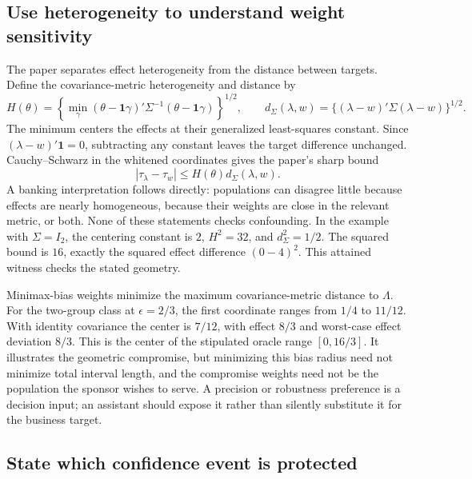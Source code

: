 \subsection{Use heterogeneity to understand weight sensitivity}

The paper separates effect heterogeneity from the distance between targets.
Define the covariance-metric heterogeneity and distance by
\begin{equation}
 H(\theta)=\left\{\min_\gamma
  (\theta-\mathbf{1}\gamma)'\Sigma^{-1}
  (\theta-\mathbf{1}\gamma)\right\}^{1/2},\qquad
 d_\Sigma(\lambda,w)=\{(\lambda-w)'\Sigma(\lambda-w)\}^{1/2}.
 \label{exec22:targets-geometry}
\end{equation}
The minimum centers the effects at their generalized least-squares constant.
Since $(\lambda-w)'\mathbf{1}=0$, subtracting any constant leaves the target
difference unchanged. Cauchy--Schwarz in the whitened coordinates gives the
paper's sharp bound
\begin{equation}
 |\tau_\lambda-\tau_w|
 \leq H(\theta)d_\Sigma(\lambda,w).
 \label{exec22:targets-bound}
\end{equation}
A banking interpretation follows directly: populations can disagree little
because effects are nearly homogeneous, because their weights are close in the
relevant metric, or both. None of these statements checks confounding.
In the example with $\Sigma=I_2$, the centering constant is $2$,
$H^2=32$, and $d_\Sigma^2=1/2$. The squared bound is $16$, exactly the squared
effect difference $(0-4)^2$. This attained witness checks the stated geometry.

Minimax-bias weights minimize the maximum covariance-metric distance to
$\Lambda$. For the two-group class at $\epsilon=2/3$, the first coordinate
ranges from $1/4$ to $11/12$. With identity covariance the center is
$7/12$, with effect $8/3$ and worst-case effect deviation $8/3$. This is the
center of the stipulated oracle range $[0,16/3]$. It illustrates the geometric
compromise, but minimizing this bias radius need not minimize total interval
length, and the compromise weights need not be the population the sponsor
wishes to serve. A precision or robustness preference is a decision input;
an assistant should expose it rather than silently substitute it for the
business target.

\subsection{State which confidence event is protected}

